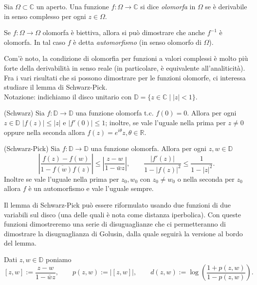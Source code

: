 \begin{defn}
  Sia $\Omega \subset \mathbb{C}$ un aperto. Una funzione $f:\Omega \longrightarrow \mathbb{C}$ si dice \textit{olomorfa} in $\Omega$ se è derivabile in senso complesso per ogni $z \in \Omega$.
\end{defn}

\begin{oss}
  Se $f: \Omega \longrightarrow \Omega$ olomorfa è biettiva, allora si può dimostrare che anche $f^{-1}$ è olomorfa. In tal caso $f$ è detta \textit{automorfismo} (in senso olomorfo di $\Omega$).
\end{oss}

Com'è noto, la condizione di olomorfia per funzioni a valori complessi è molto più forte della derivabilità in senso reale (in particolare, è equivalente all'analiticità). Fra i vari risultati che si possono dimostrare per le funzioni olomorfe, ci interessa studiare il lemma di Schwarz-Pick. \\

Notazione: indichiamo il disco unitario con $\mathbb{D}=\{z \in \mathbb{C} \mid |z|<1\}$.

\begin{lm}
  (Schwarz) Sia $f:\mathbb{D} \longrightarrow \mathbb{D}$ una funzione olomorfa t.c. $f(0)=0$. Allora per ogni $z \in \mathbb{D}$ $|f(z)| \le |z|$ e $|f'(0)| \le 1$; inoltre, se vale l'uguale nella prima per $z \not=0$ oppure nella seconda allora $f(z)=e^{i\theta}z, \theta \in \mathbb{R}$.
\end{lm}

\begin{lm}
  (Schwarz-Pick) Sia $f:\mathbb{D} \longrightarrow \mathbb{D}$ una funzione olomorfa.
  Allora per ogni $z, w \in \mathbb{D}$
  $$\left|\frac{f(z)-f(w)}{1-\overline{f(w)}f(z)}\right| \le \left|\frac{z-w}{1-\bar{w}z}\right|, \qquad \frac{|f'(z)|}{1-|f(z)|^2} \le \frac{1}{1-|z|^2}.$$
  Inoltre se vale l'uguale nella prima per $z_0, w_0$ con $z_0 \not=w_0$ o nella seconda per $z_0$ allora $f$ è un automorfismo e vale l'uguale sempre.
\end{lm}

Il lemma di Schwarz-Pick può essere riformulato usando due funzioni di due variabili sul disco (una delle quali è nota come distanza iperbolica). Con queste funzioni dimostreremo una serie di disuguaglianze che ci permetteranno di dimostrare la disuguaglianza di Golusin, dalla quale seguirà la versione al bordo del lemma.

\begin{defn}
  Dati $z, w \in \mathbb{D}$ poniamo
  $$[z,w]:=\frac{z-w}{1-\bar{w}z}, \qquad p(z,w):=|[z,w]|, \qquad d(z,w):=\log\left(\frac{1+p(z,w)}{1-p(z,w)}\right).$$
\end{defn}


